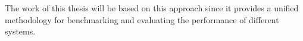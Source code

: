 The work of this thesis will be based on this approach since it provides a unified methodology for benchmarking and evaluating the performance of different systems.


